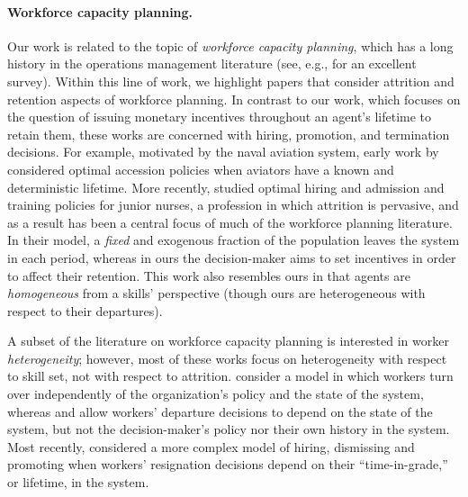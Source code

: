 \documentclass[12pt]{article}
\begin{document}
\paragraph{Workforce capacity planning.} Our work is related to the topic of {\it workforce capacity planning}, which has a long history in the operations management literature (see, e.g., \cite{de2015workforce} for an excellent survey). Within this line of work, we highlight papers that consider attrition and retention aspects of workforce planning. In contrast to our work, which focuses on the question of issuing monetary incentives throughout an agent's lifetime to retain them, these works are concerned with {hiring}, promotion, and {termination} decisions. For example, motivated by the naval aviation system, early work by \cite{grinold1976manpower} considered optimal accession policies when aviators have a known and deterministic lifetime. More recently, \cite{hu2016strategic} studied optimal hiring and admission and training policies for junior nurses, a profession in which attrition is pervasive, and as a result has been a central focus of much of the workforce planning literature. In their model, a {\it fixed} and exogenous fraction of the population leaves the system in each period, whereas in ours the decision-maker aims to set incentives in order to affect their retention. This work also resembles ours in that agents are {\it homogeneous} from a skills' perspective (though ours are heterogeneous with respect to their departures). 

A subset of the literature on workforce capacity planning is interested in worker {\it heterogeneity}; however, most of these works focus on heterogeneity with respect to skill set, not with respect to attrition. \cite{ahn2005staffing} consider a model in which workers turn over independently of the organization's policy and the state of the system, whereas \cite{gans2002managing} and \cite{arlotto2014optimal} allow workers' departure decisions to depend on the state of the system, but not the decision-maker's policy nor their own history in the system. Most recently, \cite{jaillet2021strategic} considered a more complex model of hiring, dismissing and promoting when workers' resignation decisions depend on their ``time-in-grade,'' or lifetime, in the system. 
\end{document}
